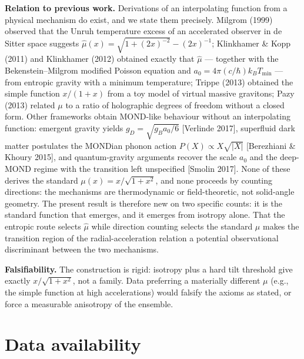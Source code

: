 \documentclass[11pt]{article}
\theoremstyle{plain}
\begin{document}
\noindent\textbf{Relation to previous work.} Derivations of an interpolating function from a physical mechanism do exist, and we state them precisely. Milgrom (1999) observed that the Unruh temperature excess of an accelerated observer in de Sitter space suggests $\hat\mu(x) = \sqrt{1+(2x)^{-2}} - (2x)^{-1}$; Klinkhamer \& Kopp (2011) and Klinkhamer (2012) obtained exactly that $\hat\mu$ --- together with the Bekenstein--Milgrom modified Poisson equation and $a_0 = 4\pi(c/\hbar)k_B T_{\min}$ --- from entropic gravity with a minimum temperature; Trippe (2013) obtained the simple function $x/(1+x)$ from a toy model of virtual massive gravitons; Pazy (2013) related $\mu$ to a ratio of holographic degrees of freedom without a closed form. Other frameworks obtain MOND-like behaviour without an interpolating function: emergent gravity yields $g_D=\sqrt{g_B a_0/6}$ [Verlinde 2017], superfluid dark matter postulates the MONDian phonon action $P(X)\propto X\sqrt{|X|}$ [Berezhiani \& Khoury 2015], and quantum-gravity arguments recover the scale $a_0$ and the deep-MOND regime with the transition left unspecified [Smolin 2017]. None of these derives the standard $\mu(x)=x/\sqrt{1+x^2}$, and none proceeds by counting directions: the mechanisms are thermodynamic or field-theoretic, not solid-angle geometry. The present result is therefore new on two specific counts: it is the standard function that emerges, and it emerges from isotropy alone. That the entropic route selects $\hat\mu$ while direction counting selects the standard $\mu$ makes the transition region of the radial-acceleration relation a potential observational discriminant between the two mechanisms.

\noindent\textbf{Falsifiability.} The construction is rigid: isotropy plus a hard tilt threshold give exactly $x/\sqrt{1+x^2}$, not a family. Data preferring a materially different $\mu$ (e.g., the simple function at high accelerations) would falsify the axioms as stated, or force a measurable anisotropy of the ensemble.

\section{Data availability}\label{sec:data}
\end{document}
